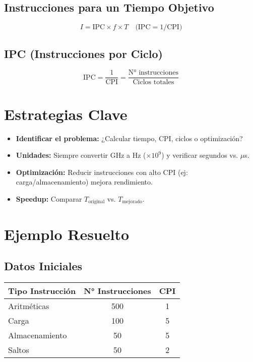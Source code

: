 \documentclass[12pt, a4paper]{article}
\begin{document}
\subsection{Instrucciones para un Tiempo Objetivo}
\[
I = \text{IPC} \times f \times T \quad \text{(IPC} = 1/\text{CPI)}
\]

\subsection{IPC (Instrucciones por Ciclo)}
\[
\text{IPC} = \frac{1}{\text{CPI}} = \frac{\text{N° instrucciones}}{\text{Ciclos totales}}
\]

\section{Estrategias Clave}

\begin{itemize}
    \item \textbf{Identificar el problema:} ¿Calcular tiempo, CPI, ciclos o optimización?
    \item \textbf{Unidades:} Siempre convertir GHz a Hz (\( \times 10^9\)) y verificar segundos vs. \(\mu\)s.
    \item \textbf{Optimización:} Reducir instrucciones con alto CPI (ej: carga/almacenamiento) mejora rendimiento.
    \item \textbf{Speedup:} Comparar \(T_{\text{original}}\) vs. \(T_{\text{mejorado}}\).
\end{itemize}

\section{Ejemplo Resuelto}

\subsection{Datos Iniciales}
\begin{tabular}{lcc}
    \toprule
    Tipo Instrucción & N° Instrucciones & CPI \\
    \midrule
    Aritméticas      & 500             & 1   \\
    Carga           & 100             & 5   \\
    Almacenamiento  & 50              & 5   \\
    Saltos          & 50              & 2   \\
    \bottomrule
\end{tabular}
\end{document}
